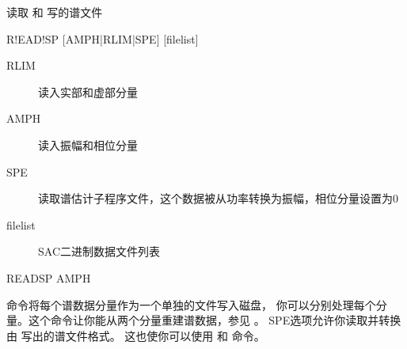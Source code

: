 \label{cmd:readsp}

读取  和  写的谱文件

\begin{SACSTX}
R!EAD!SP [AMPH|RLIM|SPE] [filelist]
\end{SACSTX}

\begin{description}
\item [RLIM] 读入实部和虚部分量
\item [AMPH] 读入振幅和相位分量
\item [SPE] 读取谱估计子程序文件，这个数据被从功率转换为振幅，相位分量设置为0
\item [filelist] SAC二进制数据文件列表
\end{description}

\begin{SACDFT}
READSP AMPH
\end{SACDFT}

 命令将每个谱数据分量作为一个单独的文件写入磁盘，
你可以分别处理每个分量。这个命令让你能从两个分量重建谱数据，参见 。
SPE选项允许你读取并转换由  写出的谱文件格式。
这也使你可以使用  和  命令。
